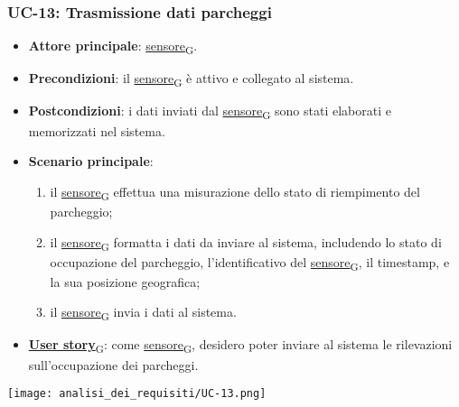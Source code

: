 \subsubsection{UC-13: Trasmissione dati parcheggi}
\begin{itemize}
	\item \textbf{Attore principale}: \href{https://7last.github.io/docs/pb/documentazione-interna/glossario\#sensore}{sensore\textsubscript{G}}.
	\item \textbf{Precondizioni}: il \href{https://7last.github.io/docs/pb/documentazione-interna/glossario\#sensore}{sensore\textsubscript{G}} è attivo e collegato al sistema.
	\item \textbf{Postcondizioni}: i dati inviati dal \href{https://7last.github.io/docs/pb/documentazione-interna/glossario\#sensore}{sensore\textsubscript{G}} sono stati elaborati e memorizzati nel sistema.
	\item \textbf{Scenario principale}:
	      \begin{enumerate}
		      \item il \href{https://7last.github.io/docs/pb/documentazione-interna/glossario\#sensore}{sensore\textsubscript{G}} effettua una misurazione dello stato di riempimento del parcheggio;
		      \item il \href{https://7last.github.io/docs/pb/documentazione-interna/glossario\#sensore}{sensore\textsubscript{G}} formatta i dati da inviare al sistema, includendo lo stato di occupazione del parcheggio, l'identificativo del \href{https://7last.github.io/docs/pb/documentazione-interna/glossario\#sensore}{sensore\textsubscript{G}},
		            il timestamp, e la sua posizione geografica;
		      \item il \href{https://7last.github.io/docs/pb/documentazione-interna/glossario\#sensore}{sensore\textsubscript{G}} invia i dati al sistema.
	      \end{enumerate}
	\item \href{https://7last.github.io/docs/pb/documentazione-interna/glossario\#user-story}{\textbf{User story}\textsubscript{G}}:
	      come \href{https://7last.github.io/docs/pb/documentazione-interna/glossario\#sensore}{sensore\textsubscript{G}}, desidero poter inviare al sistema le rilevazioni sull'occupazione dei parcheggi.
\end{itemize}

\begin{center}
	\texttt{[image: analisi\_dei\_requisiti/UC-13.png]}
\end{center}

